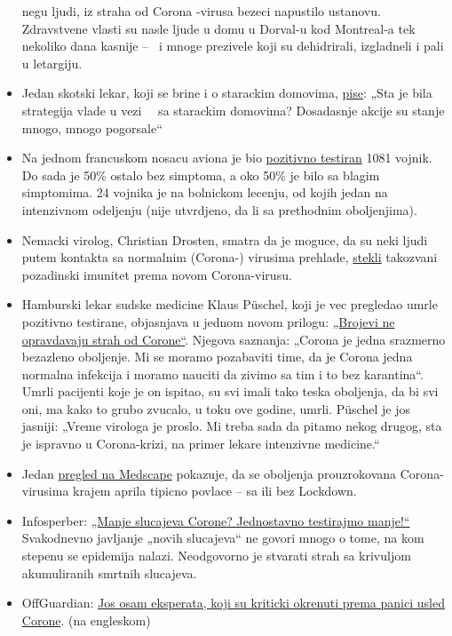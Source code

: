 \begin{itemize}
  negu ljudi, iz straha od Corona -virusa bezeci napustilo ustanovu.
  Zdravstvene vlasti su nasle ljude u domu u Dorval-u kod Montreal-a tek
  nekoliko dana kasnije --~ i mnoge prezivele koji su dehidrirali,
  izgladneli i pali u letargiju.
\item
  Jedan skotski lekar, koji se brine i o starackim domovima,
  \href{https://drmalcolmkendrick.org/2020/04/17/care-homes-and-covid19/}{pise}:
  „Sta je bila strategija vlade u vezi ~~sa starackim domovima?
  Dosadasnje akcije su stanje mnogo, mnogo pogorsale``
\item
  Na jednom francuskom nosacu aviona je bio
  \href{https://www.ouest-france.fr/sante/virus/coronavirus/coronavirus-au-moins-940-marins-positifs-sur-le-charles-de-gaulle-et-son-escorte-6810816}{pozitivno
  testiran} 1081 vojnik. Do sada je 50\% ostalo bez simptoma, a oko 50\%
  je bilo sa blagim simptomima. 24 vojnika je na bolnickom lecenju, od
  kojih jedan na intenzivnom odeljenju (nije utvrdjeno, da li sa
  prethodnim oboljenjima).
\item
  Nemacki virolog, Christian Drosten, smatra da je moguce, da su neki
  ljudi putem kontakta sa normalnim (Corona-) virusima prehlade,
  \href{https://www.watson.de/!324026684}{stekli} takozvani pozadinski
  imunitet prema novom Corona-virusu.
\item
  Hamburski lekar sudske medicine Klaus Püschel, koji je vec pregledao
  umrle pozitivno testirane, objasnjava u jednom novom prilogu:
  \href{https://www.abendblatt.de/hamburg/article228908865/hamburg-corona-virus-uke-infektion-covid-19-pueschel-coronavirus-krise-patienten-impfstoff-immunitaet-krankenhaeuser-kontaktverbot-kliniken-infektionsrate-krankheit-pandemie-test-lungenkrankheit-sars-cov-epidemie-sars-cov-2.html}{„Brojevi
  ne opravdavaju strah od Corone``}. Njegova saznanja: „Corona je jedna
  srazmerno bezazleno oboljenje. Mi se moramo pozabaviti time, da je
  Corona jedna normalna infekcija i moramo nauciti da zivimo sa tim i to
  bez karantina``. Umrli pacijenti koje je on ispitao, su svi imali tako
  teska oboljenja, da bi svi oni, ma kako to grubo zvucalo, u toku ove
  godine, umrli. Püschel je jos jasniji: „Vreme virologa je proslo. Mi
  treba sada da pitamo nekog drugog, sta je ispravno u Corona-krizi, na
  primer lekare intenzivne medicine.``
\item
  Jedan
  \href{https://emedicine.medscape.com/article/227820-overview}{pregled
  na Medscape} pokazuje, da se oboljenja prouzrokovana Corona-virusima
  krajem aprila tipicno povlace -- sa ili bez Lockdown.
\item
  Infosperber:
  \href{https://www.infosperber.ch/Artikel/Gesundheit/Weniger-Corona-Falle-Einfach-weniger-testen}{„Manje
  slucajeva Corone? Jednostavno testirajmo manje!``} Svakodnevno
  javljanje „novih slucajeva`` ne govori mnogo o tome, na kom stepenu se
  epidemija nalazi. Neodgovorno je stvarati strah sa krivuljom
  akumuliranih smrtnih slucajeva.
\item
  OffGuardian:
  \href{https://off-guardian.org/2020/04/17/8-more-experts-questioning-the-coronavirus-panic/}{Jos
  osam eksperata, koji su kriticki okrenuti prema panici usled Corone}.
  (na engleskom)
\end{itemize}

